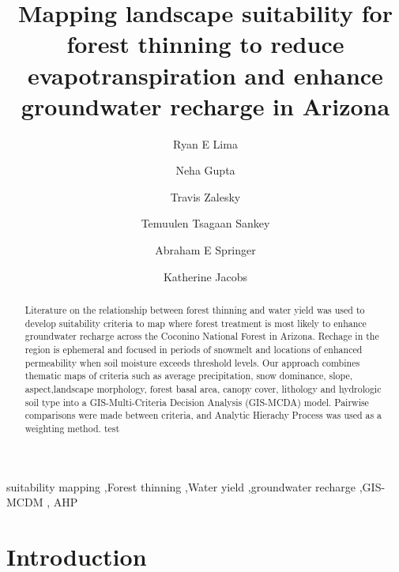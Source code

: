 \documentclass[
  number,
  preprint,
  3p,
  onecolumn]{elsarticle}
\begin{document}
\begin{frontmatter}
\title{Mapping landscape suitability for forest thinning to reduce
evapotranspiration and enhance groundwater recharge in Arizona}
\author[1]{Ryan E Lima%
%
}
\author[2]{Neha Gupta%
%
}

\author[2]{Travis Zalesky%
%
}

\author[1]{Temuulen Tsagaan Sankey%
%
}

\author[1]{Abraham E Springer%
%
}

\author[2]{Katherine Jacobs%
%
}









        
\begin{abstract}
Literature on the relationship between forest thinning and water yield
was used to develop suitability criteria to map where forest treatment
is most likely to enhance groundwater recharge across the Coconino
National Forest in Arizona. Rechage in the region is ephemeral and
focused in periods of snowmelt and locations of enhanced permeability
when soil moisture exceeds threshold levels. Our approach combines
thematic maps of criteria such as average precipitation, snow dominance,
slope, aspect,landscape morphology, forest basal area, canopy cover,
lithology and hydrologic soil type into a GIS-Multi-Criteria Decision
Analysis (GIS-MCDA) model. Pairwise comparisons were made between
criteria, and Analytic Hierachy Process was used as a weighting method.
test
\end{abstract}





\begin{keyword}
    suitability mapping \sep Forest thinning \sep Water
yield \sep groundwater recharge \sep GIS-MCDM \sep 
    AHP
\end{keyword}
\end{frontmatter}
    

\section{Introduction}\label{sec-intro}
\end{document}

